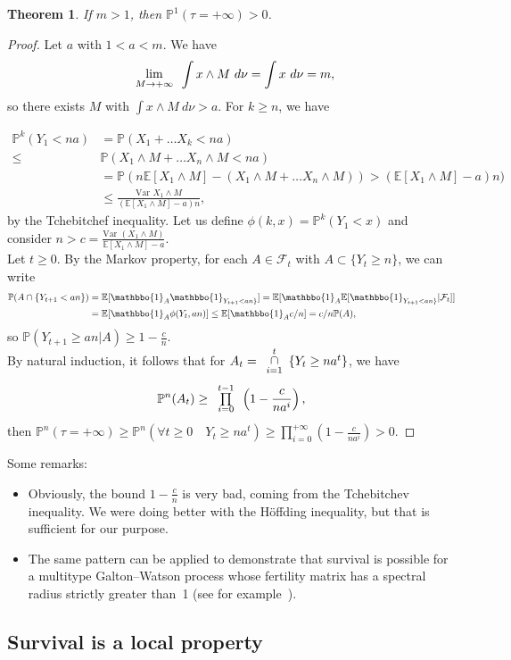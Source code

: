 \documentclass[svgnames]{amsart}
\newcommand{\E}{\ensuremath{\mathbb{E}}}
\renewcommand{\P}{\ensuremath{\mathbb{P}}}
\newcommand{\miniop}[3]{%
\renewcommand{\arraystretch}{0.6}
\begin{array}{c}
{\scriptstyle #1}\\
#2\\
{\scriptstyle #3}
\end{array}
\renewcommand{\arraystretch}{1}}
\newcommand{\1}{\mathbbo{1}}
\newcommand{\Var}{\text{Var }}
\newtheorem{theo}{Theorem}
\begin{document}
\begin{theo}
\label{surcritique}
If $m>1$, then $\P^{1}(\tau=+\infty)>0$.
\end{theo}
\begin{proof}
Let $a$ with $1<a<m$. We have
$$\miniop{}{\lim}{M\to +\infty} \int x\wedge M \ d\nu= \int  x \ d\nu=m,$$ so there exists $M$ with  $\int x\wedge M \ d\nu>a$.  For $k\ge n$, we have

\begin{align*}
\P^k(Y_1<na)&=\P(X_1+\dots X_k<na)\\\le &\P(X_1\wedge M+\dots X_n\wedge M<na)\\& =\P(n\E[X_1\wedge M]-(X_1\wedge M+\dots X_n\wedge M))> (\E[X_1\wedge M]-a)n)\\& \le\frac{\Var X_1\wedge M}{(\E[X_1\wedge M]-a)n},
\end{align*}
by the  Tchebitchef inequality. 
Let us define $\phi(k,x)=\P^k(Y_1<x)$ and consider $n>c=\frac{\Var (X_1\wedge M)}{\E[X_1\wedge M]-a}$.\\
Let $t\ge 0$. By the Markov property, for each
 $A\in \mathcal{F}_t$ with $A\subset\{Y_t\ge n\}$, we can write
\begin{align*}
\P(A\cap \{Y_{t+1}<an\})&=
\E[\1_A  \1_{Y_{t+1}<an\}}]=\E[\1_A\E[\1_{Y_{t+1}<an\}}|\mathcal{F}_t]]\\
&=\E[\1_A \phi(Y_t,an)]\le \E [\1_A c/n]=c/n\P(A),
\end{align*}
so $\P(Y_{t+1}\ge an| A)\ge 1-\frac{c}n$.\\
By natural induction, it follows that for $A_t=\miniop{t}{\cap}{i=1}\{Y_{t}\ge na^t\}$, we have
$$\P^n(A_t)\ge\miniop{t-1}{\prod}{i=0}\left(1-\frac{c}{na^i}\right),$$
then
$\P^n(\tau=+\infty)\ge\P^n(\forall t\ge 0\quad Y_{t}\ge na^t)\ge\prod_{i=0}^{+\infty} \left(1-\frac{c}{na^i}\right)>0.$
\end{proof}

Some remarks:
\begin{itemize}
\item Obviously, the bound $1-\frac{c}n$ is very bad, coming from the Tchebitchev inequality. We were doing better with the Höffding inequality, but that is sufficient for our purpose.
\item  The same pattern can be applied to demonstrate that survival is possible for a multitype Galton--Watson process whose fertility matrix has a spectral radius strictly greater than~1 (see for example~\cite{Garet-livre}).
\end{itemize}
\subsection{Survival is a local property}
\end{document}
